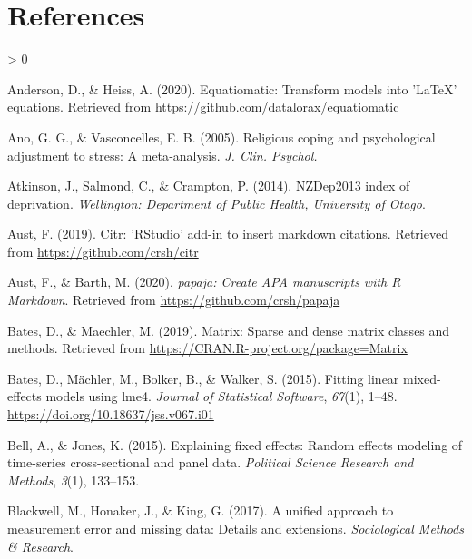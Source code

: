 \documentclass[
  english,
  man,floatsintext]{apa6}
\newlength{\cslhangindent}
\newenvironment{CSLReferences}[2] %
 {%
  \setlength{\parindent}{0pt}
  \ifodd #1 \everypar{\setlength{\hangindent}{\cslhangindent}}\ignorespaces\fi
  \ifnum #2 > 0
  \setlength{\parskip}{#2\baselineskip}
  \fi
 }%
 {}
\begin{document}
\newpage

\hypertarget{references}{%
\section{References}\label{references}}

\begingroup
\setlength{\parindent}{-0.5in}
\setlength{\leftskip}{0.5in}

\hypertarget{refs}{}
\begin{CSLReferences}{1}{0}
\leavevmode\hypertarget{ref-R-equatiomatic}{}%
Anderson, D., \& Heiss, A. (2020). Equatiomatic: Transform models into 'LaTeX' equations. Retrieved from \url{https://github.com/datalorax/equatiomatic}

\leavevmode\hypertarget{ref-Ano2005-hx}{}%
Ano, G. G., \& Vasconcelles, E. B. (2005). Religious coping and psychological adjustment to stress: A meta‐analysis. \emph{J. Clin. Psychol.}

\leavevmode\hypertarget{ref-Atkinson2014-ex}{}%
Atkinson, J., Salmond, C., \& Crampton, P. (2014). {NZDep2013} index of deprivation. \emph{Wellington: Department of Public Health, University of Otago}.

\leavevmode\hypertarget{ref-R-citr}{}%
Aust, F. (2019). Citr: 'RStudio' add-in to insert markdown citations. Retrieved from \url{https://github.com/crsh/citr}

\leavevmode\hypertarget{ref-R-papaja}{}%
Aust, F., \& Barth, M. (2020). \emph{{papaja}: {Create} {APA} manuscripts with {R Markdown}}. Retrieved from \url{https://github.com/crsh/papaja}

\leavevmode\hypertarget{ref-R-Matrix}{}%
Bates, D., \& Maechler, M. (2019). Matrix: Sparse and dense matrix classes and methods. Retrieved from \url{https://CRAN.R-project.org/package=Matrix}

\leavevmode\hypertarget{ref-R-lme4}{}%
Bates, D., Mächler, M., Bolker, B., \& Walker, S. (2015). Fitting linear mixed-effects models using {lme4}. \emph{Journal of Statistical Software}, \emph{67}(1), 1--48. \url{https://doi.org/10.18637/jss.v067.i01}

\leavevmode\hypertarget{ref-bell2015explaining}{}%
Bell, A., \& Jones, K. (2015). Explaining fixed effects: Random effects modeling of time-series cross-sectional and panel data. \emph{Political Science Research and Methods}, \emph{3}(1), 133--153.

\leavevmode\hypertarget{ref-Blackwell2017-oq}{}%
Blackwell, M., Honaker, J., \& King, G. (2017). A unified approach to measurement error and missing data: Details and extensions. \emph{Sociological Methods \& Research}.


\end{CSLReferences}
\end{document}
